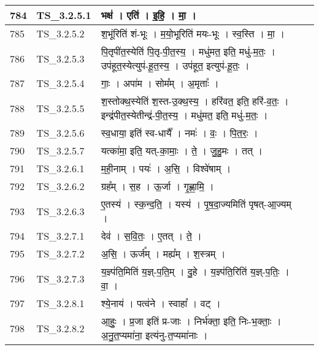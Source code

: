 \documentclass[17pt]{extarticle}
\begin{document}
\begin{longtable}{||p{0.4in}||p{0.9in}||p{4.0in}||p{0.9in}||}
        \hline
            784 & TS\_3.2.5.1 & भक्ष॑   ।   एति॑   ।   इ॒हि॒   ।   मा॒   ।    &      \\
        \hline
            785 & TS\_3.2.5.2 & श॒भूंरिति॑ शं{-}भूः   ।   म॒यो॒भूरिति॑ मयः{-}भूः   ।   स्व॒स्ति   ।   मा॒   ।    &      \\
        \hline
            786 & TS\_3.2.5.3 & पि॒तृपी॑त॒स्येति॑ पि॒तृ{-}पी॒त॒स्य॒   ।   मधु॑मत॒ इति॒ मधु॑{-}म॒तः॒   ।   उप॑हूत॒स्येत्युप॑{-}हू॒त॒स्य॒   ।   उप॑हूत॒ इत्युप॑{-}हू॒तः॒   ।    &      \\
        \hline
            787 & TS\_3.2.5.4 & गाः॒   ।   अपा॑म   ।   सोम᳚म्   ।   अ॒मृताः᳚   ।    &      \\
        \hline
            788 & TS\_3.2.5.5 & श॒स्तोक्थ॒स्येति॑ श॒स्त{-}उ॒क्थ॒स्य॒   ।   हरि॑वत॒ इति॒ हरि॑{-}व॒तः॒   ।   इन्द्र॑पीत॒स्येतीन्द्र॑{-}पी॒त॒स्य॒   ।   मधु॑मत॒ इति॒ मधु॑{-}म॒तः॒   ।    &      \\
        \hline
            789 & TS\_3.2.5.6 & स्व॒धाया॒ इति॑ स्व{-}धायै᳚   ।   नमः॑   ।   वः॒   ।   पि॒त॒रः॒   ।    &      \\
        \hline
            790 & TS\_3.2.5.7 & यत्का॑मा॒ इति॒ यत्{-}का॒माः॒   ।   ते॒   ।   जु॒हु॒मः   ।   तत्   ।    &      \\
        \hline
            791 & TS\_3.2.6.1 & म॒ही॒नाम्   ।   पयः॑   ।   अ॒सि॒   ।   विश्वे॑षाम्   ।    &      \\
        \hline
            792 & TS\_3.2.6.2 & ग्रह᳚म्   ।   स॒ह   ।   ऊ॒र्जा   ।   गृ॒ह्णा॒मि॒   ।    &      \\
        \hline
            793 & TS\_3.2.6.3 & ए॒तस्य॑   ।   स्क॒न्द॒ति॒   ।   यस्य॑   ।   पृ॒ष॒दा॒ज्यमिति॑ पृषत्{-}आ॒ज्यम्   ।    &      \\
        \hline
            794 & TS\_3.2.7.1 & देव॑   ।   स॒वि॒तः॒   ।   ए॒तत्   ।   ते॒   ।    &      \\
        \hline
            795 & TS\_3.2.7.2 & अ॒सि॒   ।   ऊर्ज᳚म्   ।   मह्य᳚म्   ।   श॒स्त्रम्   ।    &      \\
        \hline
            796 & TS\_3.2.7.3 & य॒ज्ञ्प॑ति॒मिति॑ य॒ज्ञ्{-}प॒ति॒म्   ।   दु॒हे   ।   य॒ज्ञ्प॑ति॒रिति॑ य॒ज्ञ्{-}प॒तिः॒   ।   वा॒   ।    &      \\
        \hline
            797 & TS\_3.2.8.1 & श्ये॒नाय॑   ।   पत्व॑ने   ।   स्वाहा᳚   ।   वट्   ।    &      \\
        \hline
            798 & TS\_3.2.8.2 & आ॒हुः॒   ।   प्र॒जा इति॑ प्र{-}जाः   ।   निर्भ॑क्ता॒ इति॒ निः{-}भ॒क्ताः॒   ।   अ॒नु॒त॒प्यमा॑ना॒ इत्य॑नु{-}त॒प्यमा॑नाः   ।    &      \\

\end{longtable}
\end{document}
